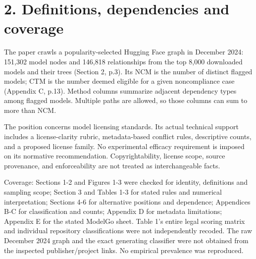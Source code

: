 \documentclass[10pt]{article}
\begin{document}
\section*{2. Definitions, dependencies and coverage}
The paper crawls a popularity-selected Hugging Face graph in December 2024: 151,302 model nodes and 146,818 relationships from the top 8,000 downloaded models and their trees (Section 2, p.3). Its NCM is the number of distinct flagged models; CTM is the number deemed eligible for a given noncompliance case (Appendix C, p.13). Method columns summarize adjacent dependency types among flagged models. Multiple paths are allowed, so those columns can sum to more than NCM.\par
The position concerns model licensing standards. Its actual technical support includes a license-clarity rubric, metadata-based conflict rules, descriptive counts, and a proposed license family. No experimental efficacy requirement is imposed on its normative recommendation. Copyrightability, license scope, source provenance, and enforceability are not treated as interchangeable facts.\par
Coverage: Sections 1-2 and Figures 1-3 were checked for identity, definitions and sampling scope; Section 3 and Tables 1-3 for stated rules and numerical interpretation; Sections 4-6 for alternative positions and dependence; Appendices B-C for classification and counts; Appendix D for metadata limitations; Appendix E for the stated ModelGo sheet. Table 1’s entire legal scoring matrix and individual repository classifications were not independently recoded. The raw December 2024 graph and the exact generating classifier were not obtained from the inspected publisher/project links. No empirical prevalence was reproduced.\par
\end{document}
